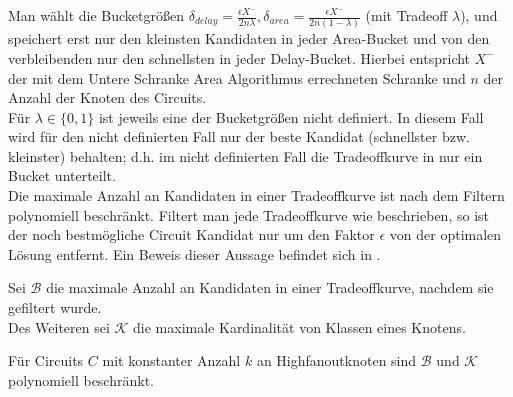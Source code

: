 \documentclass[11pt, a4paper, german]{article}
\begin{document}
Man wählt die Bucketgrößen $\delta_{delay} = \frac{\epsilon X^{-}}{2n\lambda}, \delta_{area} = \frac{\epsilon X^{-}}{2n(1-\lambda)}$ (mit Tradeoff $\lambda$), und speichert erst nur den kleinsten Kandidaten in jeder Area-Bucket und von den verbleibenden nur den schnellsten in jeder Delay-Bucket. Hierbei entspricht $X^-$ der mit dem Untere Schranke Area Algorithmus errechneten Schranke und $n$ der Anzahl der Knoten des Circuits. \\
Für $\lambda \in \{ 0,1 \}$ ist jeweils eine der Bucketgrößen nicht definiert. In diesem Fall wird für den nicht definierten Fall nur der beste Kandidat (schnellster bzw. kleinster) behalten; d.h. im nicht definierten Fall die Tradeoffkurve in nur ein Bucket unterteilt.\\
Die maximale Anzahl an Kandidaten in einer Tradeoffkurve ist nach dem Filtern polynomiell beschränkt. 
Filtert man jede Tradeoffkurve wie beschrieben, so ist der noch bestmögliche Circuit Kandidat nur um den Faktor $\epsilon$ von der optimalen Lösung entfernt. Ein Beweis dieser Aussage befindet sich in \cite{Elbert}.
\begin{definition}
Sei $\mathcal{B}$ die maximale Anzahl an Kandidaten in einer Tradeoffkurve, nachdem sie gefiltert wurde.\\
Des Weiteren sei $\mathcal{K}$ die maximale Kardinalität von Klassen eines Knotens.
\end{definition}
\begin{cor}\label{cor:anzahl_klassen}
Für Circuits $C$ mit konstanter Anzahl $k$ an Highfanoutknoten sind $\mathcal{B}$ und $\mathcal{K}$ polynomiell beschränkt.
\end{cor}
\end{document}
